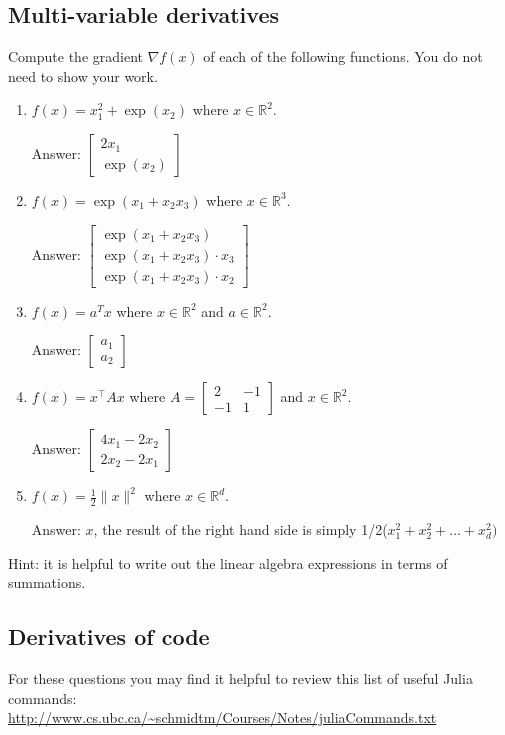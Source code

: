 \documentclass{article}
\def\ans#1{\par\gre{Answer: #1}}
\def\blu#1{{\color{blu}#1}}
\def\gre#1{{\color{gre}#1}}
\def\norm#1{\|#1\|}
\def\R{\mathbb{R}}
\begin{document}
\pagebreak
\subsection{Multi-variable derivatives}

\blu{Compute the gradient $\nabla f(x)$ of each of the following functions.} You do not need to show your work.
\begin{enumerate}
\item $f(x) = x_1^2 + \exp(x_2)$ where $x \in \R^2$.
\ans{$\left[\begin{array}{c}
2x_1\\
\exp(x_2)
\end{array}\right]$}
\item $f(x) = \exp(x_1 + x_2x_3)$ where $x \in \mathbb{R}^3$.
\ans{$\left[\begin{array}{c}
\exp(x_1 + x_2x_3)\\
\exp(x_1 + x_2x_3) \cdot x_3\\
\exp(x_1 + x_2x_3) \cdot x_2
\end{array}\right]$}
\item $f(x) = a^Tx$ where $x \in \R^2$ and $a \in \R^2$.
\ans{$\left[\begin{array}{c}
a_1\\
a_2
\end{array}\right]$}
\item $f(x) = x^\top A x$ where $A=\left[ \begin{array}{cc}
2 & -1 \\
 -1 & 1 \end{array} \right]$ and $x \in \mathbb{R}^2$.
\ans{$\left[\begin{array}{c}
4x_1 - 2x_2\\
2x_2 - 2x_1
\end{array}\right]$}
 \item $f(x) = \frac{1}{2}\norm{x}^2$ where $x \in \R^d$.
\ans{$x$, the result of the right hand side is simply 1/2($x_1^2+x_2^2+...+x_d^2)$}
\end{enumerate}
Hint: it is helpful to write out the linear algebra expressions in terms of summations.


\pagebreak

\subsection{Derivatives of code}

For these questions you may find it helpful to review this list of useful Julia commands:\\
\url{http://www.cs.ubc.ca/~schmidtm/Courses/Notes/juliaCommands.txt}
\end{document}
